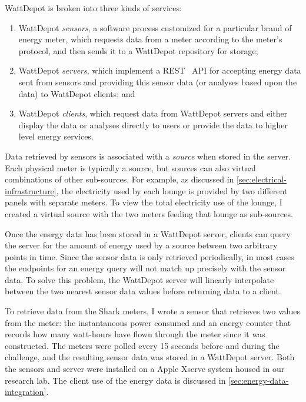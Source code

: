 WattDepot is broken into three kinds of services:

\begin{enumerate}
\item WattDepot \emph{sensors}, a software process customized for a particular brand of energy meter, which requests data from a meter according to the meter's protocol, and then sends it to a WattDepot repository for storage;

\item WattDepot \emph{servers}, which implement a REST~\cite{REST} API for accepting energy data sent from sensors and providing this sensor data (or analyses based upon the data) to WattDepot clients; and

\item WattDepot \emph{clients}, which request data from WattDepot servers and either display the data or analyses directly to users or provide the data to higher level energy services.
\end{enumerate}

Data retrieved by sensors is associated with a \emph{source} when stored in the server. Each physical meter is typically a source, but sources can also virtual combinations of other sub-sources. For example, as discussed in \autoref{sec:electrical-infrastructure}, the electricity used by each lounge is provided by two different panels with separate meters. To view the total electricity use of the lounge, I created a virtual source with the two meters feeding that lounge as sub-sources.

Once the energy data has been stored in a WattDepot server, clients can query the server for the amount of energy used by a source between two arbitrary points in time. Since the sensor data is only retrieved periodically, in most cases the endpoints for an energy query will not match up precisely with the sensor data. To solve this problem, the WattDepot server will linearly interpolate between the two nearest sensor data values before returning data to a client.

To retrieve data from the Shark meters, I wrote a sensor that retrieves two values from the meter: the instantaneous power consumed and an energy counter that records how many watt-hours have flown through the meter since it was constructed. The meters were polled every 15 seconds before and during the challenge, and the resulting sensor data was stored in a WattDepot server. Both the sensors and server were installed on a Apple Xserve system housed in our research lab. The client use of the energy data is discussed in \autoref{sec:energy-data-integration}.


